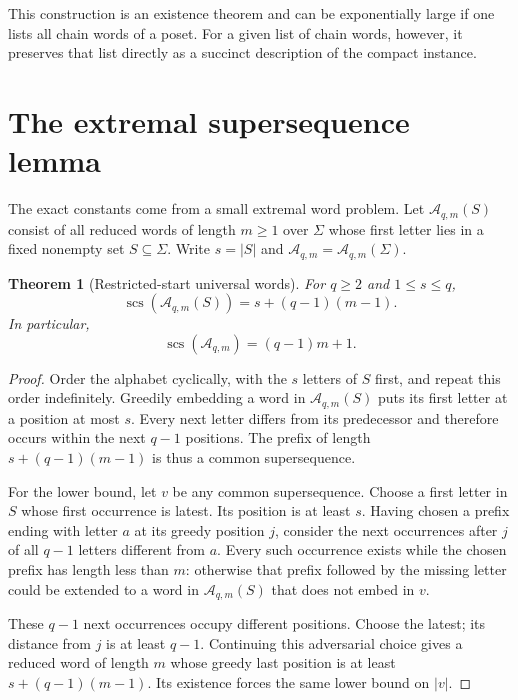 \documentclass[11pt,letterpaper]{article}
\numberwithin{equation}{section}
\newtheorem{theorem}{Theorem}[section]
\theoremstyle{definition}
\theoremstyle{remark}
\theoremstyle{definition}
\newcommand{\A}{\mathcal A}
\newcommand{\scs}{\operatorname{scs}}
\newcommand{\len}[1]{\lvert #1\rvert}
\begin{document}
This construction is an existence theorem and can be exponentially large if
one lists all chain words of a poset. For a given list of chain words, however,
it preserves that list directly as a succinct description of the compact
instance.

\section{The extremal supersequence lemma}
\label{fo:sec:universal}

The exact constants come from a small extremal word problem. Let
$\A_{q,m}(S)$ consist of all reduced words of length $m\ge1$ over $\Sigma$
whose first letter lies in a fixed nonempty set $S\subseteq\Sigma$. Write
$s=\len{S}$ and $\A_{q,m}=\A_{q,m}(\Sigma)$.

\begin{theorem}[Restricted-start universal words]\label{fo:thm:universal}
For $q\ge2$ and $1\le s\le q$,
\begin{equation}\label{fo:eq:universal}
 \scs(\A_{q,m}(S))=s+(q-1)(m-1).
\end{equation}
In particular,
\begin{equation}\label{fo:eq:universal-all}
 \scs(\A_{q,m})=(q-1)m+1.
\end{equation}
\end{theorem}

\begin{proof}
Order the alphabet cyclically, with the $s$ letters of $S$ first, and repeat this
order indefinitely. Greedily embedding a word in $\A_{q,m}(S)$ puts its first
letter at a position at most $s$. Every next letter differs from its predecessor
and therefore occurs within the next $q-1$ positions. The prefix of length
$s+(q-1)(m-1)$ is thus a common supersequence.

For the lower bound, let $v$ be any common supersequence. Choose a first letter
in $S$ whose first occurrence is latest. Its position is at least $s$. Having
chosen a prefix ending with letter $a$ at its greedy position $j$, consider the
next occurrences after $j$ of all $q-1$ letters different from $a$. Every such
occurrence exists while the chosen prefix has length less than $m$: otherwise
that prefix followed by the missing letter could be extended to a word in
$\A_{q,m}(S)$ that does not embed in $v$.

These $q-1$ next occurrences occupy different positions. Choose the latest;
its distance from $j$ is at least $q-1$. Continuing this adversarial choice gives
a reduced word of length $m$ whose greedy last position is at least
$s+(q-1)(m-1)$. Its existence forces the same lower bound on $\len{v}$.
\end{proof}
\end{document}

